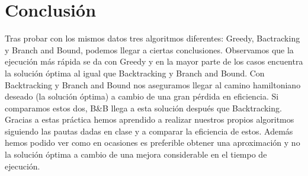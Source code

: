 \documentclass[a4]{article}
\begin{document}
\begin{figure}[H]
  \centering
\end{figure}

\section{Conclusión}

Tras probar con los mismos datos tres algoritmos diferentes: Greedy,
Bactracking y Branch and Bound, podemos llegar a ciertas
conclusiones. Observamos que la ejecución más rápida se da con Greedy
y en la mayor parte de los casos encuentra la solución óptima al igual
que Backtracking y Branch and Bound. Con Backtracking y Branch and
Bound nos aseguramos llegar al camino hamiltoniano deseado (la
solución óptima) a cambio de una gran pérdida en eficiencia. Si
comparamos estos dos, B\&B llega a esta solución después que
Backtracking. Gracias a estas práctica hemos aprendido a realizar
nuestros propios algoritmos siguiendo las pautas dadas en clase y a
comparar la eficiencia de estos. Además hemos podido ver como en
ocasiones es preferible obtener una aproximación y no la solución
óptima a cambio de una mejora considerable en el tiempo de ejecución.
\end{document}
